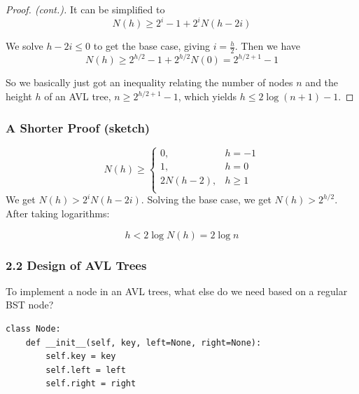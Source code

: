 \documentclass[aspectratio=169, 14pt]{beamer}
\begin{document}
\begin{frame}
	\begin{proof}[Proof. (cont.)]
		It can be simplified to
		\[N(h) \geq 2^{i} - 1 + 2^iN(h-2i)\]

		We solve $h-2i \leq 0$ to get the base case, giving $i = \frac{h}{2}$. Then we have
		\[N(h) \geq 2^{h/2} - 1 + 2^{h/2}N(0) = 2^{h/2 + 1} - 1\]

		So we basically just got an inequality relating the number of nodes $n$ and the height $h$ of an AVL tree, $n\geq 2^{h/2 + 1} - 1$, which yields $h \leq 2\log{(n + 1)} - 1$.
	\end{proof}


\end{frame}

\begin{frame}
	\frametitle{A Shorter Proof (sketch)}

	\[
		N(h) \geq
		\begin{cases}
			0,         & h = -1   \\
			1,         & h = 0    \\
			2N(h - 2), & h \geq 1 \\
		\end{cases}
	\]
	We get $N(h) > 2^{i}N(h-2i)$. Solving the base case, we get $N(h) > 2^{h/2}$. After taking logarithms:

	\[h < 2\log{N(h)} = 2\log{n}\]
\end{frame}



\begin{frame}[fragile]
	\frametitle{2.2 Design of AVL Trees}

	 To implement a node in an AVL trees, what else do we need based on a regular BST node?
	\begin{verbatim}
class Node:
    def __init__(self, key, left=None, right=None):
        self.key = key
        self.left = left
        self.right = right
    \end{verbatim}
\end{frame}
\end{document}
